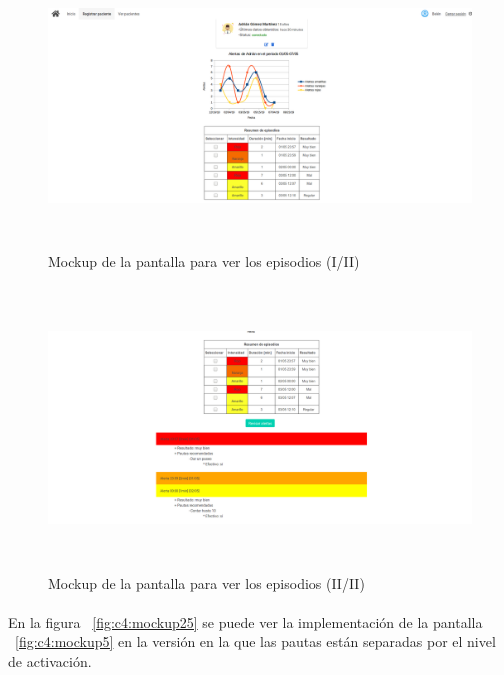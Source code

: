 \begin{figure}[!htbp]
    \centering
    \includegraphics[height=7.5cm, width=\textwidth]{Imagenes/anxA18.png}
    \caption[Mockup de la pantalla para ver los episodios (I/II)]{Mockup de la pantalla para ver los episodios (I/II)}
    \label{fig:c4:mockup27}
\end{figure}

\begin{figure}[!htbp]
    \centering
    \includegraphics[height=7.5cm, width=\textwidth]{Imagenes/anxA19.png}
    \caption[Mockup de la pantalla para ver los episodios (II/II)]{Mockup de la pantalla para ver los episodios (II/II)}
    \label{fig:c4:mockup28}
\end{figure}

\paragraph{}
En la figura ~\ref{fig:c4:mockup25} se puede ver la implementación de la pantalla ~\ref{fig:c4:mockup5} en la versión en la que las pautas están separadas por el nivel de activación.


